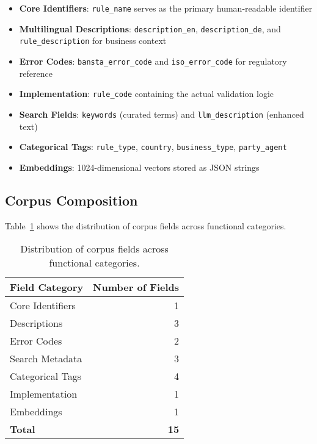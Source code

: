 \begin{itemize}[leftmargin=*,itemsep=2pt,topsep=2pt]
 \item \textbf{Core Identifiers}: \texttt{rule\_name} serves as the primary human-readable identifier
 \item \textbf{Multilingual Descriptions}: \texttt{description\_en}, \texttt{description\_de}, and \texttt{rule\_description} for business context
 \item \textbf{Error Codes}: \texttt{bansta\_error\_code} and \texttt{iso\_error\_code} for regulatory reference
 \item \textbf{Implementation}: \texttt{rule\_code} containing the actual validation logic
 \item \textbf{Search Fields}: \texttt{keywords} (curated terms) and \texttt{llm\_description} (enhanced text)
 \item \textbf{Categorical Tags}: \texttt{rule\_type}, \texttt{country}, \texttt{business\_type}, \texttt{party\_agent}
 \item \textbf{Embeddings}: 1024-dimensional vectors stored as JSON strings
\end{itemize}

\subsection{Corpus Composition}

Table~\ref{tab:corpus-composition} shows the distribution of corpus fields across functional categories.

\begin{table}[h]
\centering
\begin{tabular}{lr}
\toprule
\textbf{Field Category} & \textbf{Number of Fields} \\
\midrule
Core Identifiers & 1 \\
Descriptions & 3 \\
Error Codes & 2 \\
Search Metadata & 3 \\
Categorical Tags & 4 \\
Implementation & 1 \\
Embeddings & 1 \\
\midrule
\textbf{Total} & \textbf{15} \\
\bottomrule
\end{tabular}
\caption{Distribution of corpus fields across functional categories.}
\label{tab:corpus-composition}
\end{table}

